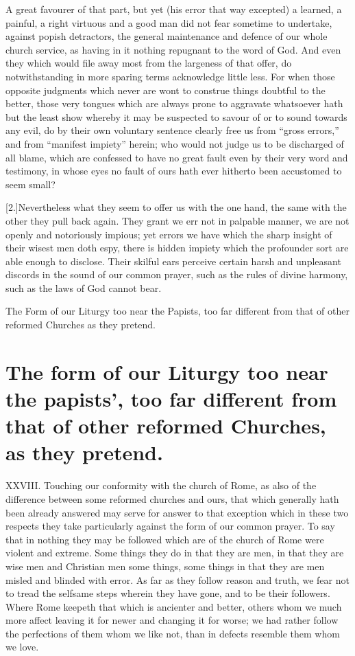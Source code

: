 A great favourer of that part, but yet (his error that way excepted) a learned, a painful, a right virtuous and a good man did not fear sometime to undertake, against popish detractors, the general maintenance and defence of our whole church service, as having in it nothing repugnant to the word of God. And even they which would file away most from the largeness of that offer, do notwithstanding in more sparing terms acknowledge little less. For when those opposite judgments which never are wont to construe things doubtful to the better, those very tongues which are always prone to aggravate whatsoever hath but the least show whereby it may be suspected to savour of or to sound towards any evil, do by their own voluntary sentence clearly free us from “gross errors,” and from “manifest impiety” herein; who would not judge us to be discharged of all blame, which are confessed to have no great fault even by their very word and testimony, in whose eyes no fault of ours hath ever hitherto been accustomed to seem small?

[2.]Nevertheless what they seem to offer us with the one hand, the same with the other they pull back again. They grant we err not in palpable manner, we are not openly and  notoriously impious;
 yet errors we have which the sharp insight of their wisest men doth espy, there is hidden impiety which the profounder sort are able enough to disclose. Their skilful ears perceive certain harsh and unpleasant discords in the sound of our common prayer, such as the rules of divine harmony, such as the laws of God cannot bear.


The Form of our Liturgy too near the Papists, too far different from that of other reformed Churches as they pretend.
\section*{The form of our Liturgy too near the papists’, too far different from that of other reformed Churches, as they pretend.}
XXVIII. Touching our conformity with the church of Rome, as also of the difference between some reformed churches and ours, that which generally hath been already answered may serve for answer to that exception which in these two respects they take particularly against the form of our common prayer. To say that in nothing they may be followed which are of the church of Rome were violent and extreme. Some things they do in that they are men, in that they are wise men and Christian men some things, some things in that they are men misled and blinded with error. As far as they follow reason and truth, we fear not to tread the selfsame steps wherein they have gone, and to be their followers. Where Rome keepeth that which is ancienter and better, others whom we much more affect leaving it for newer and changing it for worse; we had rather follow the perfections of them whom we like not, than in defects resemble them whom we love.

